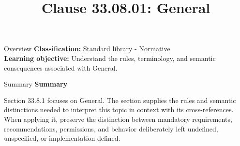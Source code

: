 \documentclass[10pt,letterpaper]{article}
\title{Clause 33.08.01: General}
\author{}
\date{}
\begin{document}
\maketitle
\begin{CornellOverviewBox}{Overview}
\textbf{Classification:} Standard library - Normative\\[2pt]
\textbf{Learning objective:} Understand the rules, terminology, and semantic consequences associated with General.
\end{CornellOverviewBox}\begin{CornellSummaryBox}{Summary}
{\sffamily\bfseries\color{Accent} Summary}\par\vspace{3pt}Section 33.8.1 focuses on General. The section supplies the rules and semantic distinctions needed to interpret this topic in context with its cross-references. When applying it, preserve the distinction between mandatory requirements, recommendations, permissions, and behavior deliberately left undefined, unspecified, or implementation-defined.
\end{CornellSummaryBox}
\end{document}

